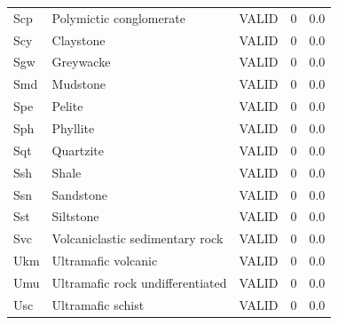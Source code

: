 \begin{table}[htbp]
\begin{tabular}{lllll}
Scp & Polymictic conglomerate & VALID & 0 & 0.0 \\
Scy & Claystone & VALID & 0 & 0.0 \\
Sgw & Greywacke & VALID & 0 & 0.0 \\
Smd & Mudstone & VALID & 0 & 0.0 \\
Spe & Pelite & VALID & 0 & 0.0 \\
Sph & Phyllite & VALID & 0 & 0.0 \\
Sqt & Quartzite & VALID & 0 & 0.0 \\
Ssh & Shale & VALID & 0 & 0.0 \\
Ssn & Sandstone & VALID & 0 & 0.0 \\
Sst & Siltstone & VALID & 0 & 0.0 \\
Svc & Volcaniclastic sedimentary rock & VALID & 0 & 0.0 \\
Ukm & Ultramafic volcanic & VALID & 0 & 0.0 \\
Umu & Ultramafic rock undifferentiated & VALID & 0 & 0.0 \\
Usc & Ultramafic schist & VALID & 0 & 0.0 \\
\bottomrule
\end{tabular}
\end{table}
